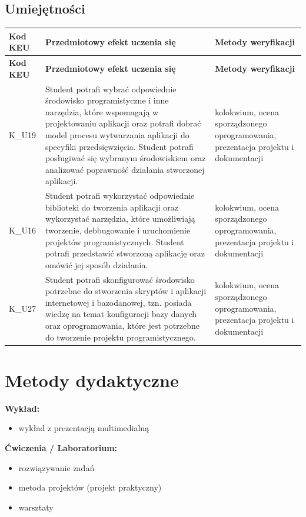 \documentclass[12pt, a4paper]{article}
\newcommand{\thdrule}{\noalign{\global\setlength{\extrarowheight}{0pt}}}
\newcommand{\thdend}{\noalign{\global\setlength{\extrarowheight}{3pt}}}
\begin{document}
\subsection*{Umiejętności}
{\scriptsize
\begin{longtable}{m{1.6cm}m{9.0cm}m{4.2cm}}
\thdrule\toprule
\rowcolor{pjatkRed} {\color{white}\footnotesize\textbf{\vphantom{Ag}Kod KEU}} & {\color{white}\footnotesize\textbf{\vphantom{Ag}Przedmiotowy efekt uczenia się}} & {\color{white}\footnotesize\textbf{\vphantom{Ag}Metody weryfikacji}} \\
\midrule\thdend
\endfirsthead
\thdrule\toprule
\rowcolor{pjatkRed} {\color{white}\footnotesize\textbf{\vphantom{Ag}Kod KEU}} & {\color{white}\footnotesize\textbf{\vphantom{Ag}Przedmiotowy efekt uczenia się}} & {\color{white}\footnotesize\textbf{\vphantom{Ag}Metody weryfikacji}} \\
\midrule\thdend
\endhead
  \rowcolor{tableRowLight} K\_U19 & Student potrafi wybrać odpowiednie środowisko programistyczne i inne narzędzia, które wspomagają w projektowaniu aplikacji oraz potrafi dobrać model procesu wytwarzania aplikacji  do specyfiki przedsięwzięcia. Student potrafi posługiwać się wybranym środowiskiem oraz analizować poprawność działania stworzonej aplikacji. & kolokwium, ocena sporządzonego oprogramowania, prezentacja projektu i dokumentacji \\
  \rowcolor{tableRowAlt} K\_U16 & Student potrafi wykorzystać odpowiednie biblioteki do tworzenia aplikacji oraz wykorzystać narzędzia, które umożliwiają tworzenie,  debbugowanie i uruchomienie projektów programistycznych. Student potrafi przedstawić stworzoną aplikację oraz omówić jej sposób działania. & kolokwium, ocena sporządzonego oprogramowania, prezentacja projektu i dokumentacji \\
  \rowcolor{tableRowLight} K\_U27 & Student potrafi skonfigurować środowisko potrzebne do stworzenia skryptów i aplikacji internetowej i bazodanowej, tzn. posiada wiedzę na temat konfiguracji bazy danych oraz oprogramowania, które jest potrzebne do tworzenie projektu programistycznego. & kolokwium, ocena sporządzonego oprogramowania, prezentacja projektu i dokumentacji \\
\bottomrule
\end{longtable}}

\section{Metody dydaktyczne}

\textbf{Wykład:}
\begin{itemize}
  \item wykład z prezentacją multimedialną
\end{itemize}
\vspace{4pt}
\textbf{Ćwiczenia / Laboratorium:}
\begin{itemize}
  \item rozwiązywanie zadań
  \item metoda projektów (projekt praktyczny)
  \item warsztaty
\end{itemize}
\vspace{4pt}
\end{document}
